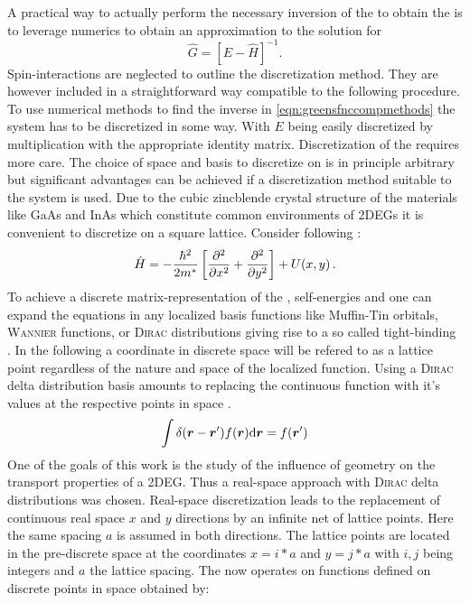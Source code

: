 A practical way to actually perform the necessary inversion of the \hamil{} to obtain the \gfnc{} is to leverage numerics to obtain an approximation to the solution for
\begin{equation}
	\hat{G} = \left[E-\hat{H} \right]^{-1}\text{.}
  \label{eqn:greensfnccompmethods}
\end{equation}
Spin-interactions are neglected to outline the discretization method. They are however included in a straightforward way compatible to the following procedure.
To use numerical methods to find the inverse in \cref{eqn:greensfnccompmethods} the system has to be discretized in some way. With $E$ being easily discretized by multiplication with the appropriate identity matrix. Discretization of the \hamil{} requires more care. The choice of space and basis to discretize on is in principle arbitrary but significant advantages can be achieved if a discretization method suitable to the system is used.
Due to the cubic zincblende crystal structure of the materials like GaAs and InAs which constitute common environments of 2DEGs it is convenient to discretize on a square lattice.
Consider following \hamil{}:
\begin{equation}
  \hat{H}=-\frac{\hbar^{2}}{2m^*}\left[\frac{\partial^2 }{\partial x^2}+\frac{\partial^2 }{\partial y^2}\right]+U(x,y)\text{\,.}
    \label{eqn:Hamil}
\end{equation}
To achieve a discrete matrix-representation of the \hamil{}, self-energies and \gfnc{} one can expand the equations in any localized basis functions like Muffin-Tin orbitals, \textsc{Wannier} functions, or \textsc{Dirac} distributions giving rise to a so called tight-binding \hamil{}. In the following a coordinate in discrete space will be refered to as a lattice point regardless of the nature and space of the localized function.
Using a \textsc{Dirac} delta distribution basis amounts to replacing the continuous function with it's values at the respective points in space \cite{JApplPhys.92.3730}.
\begin{equation}
  \int \delta (\boldsymbol{r}-\boldsymbol{r}') f(\boldsymbol{r}) \mathrm{d}\boldsymbol{r} = f(\boldsymbol{r}')
  \label{eqn:deltabasis}
\end{equation}
One of the goals of this work is the study of the influence of geometry on the transport properties of a 2DEG. Thus a real-space approach with \textsc{Dirac} delta distributions was chosen. Real-space discretization leads to the replacement of continuous real space $x$ and $y$ directions by an infinite net of lattice points. Here the same spacing $a$ is assumed in both directions. The lattice points are located in the pre-discrete space at the coordinates $x=i*a$ and $y=j*a$ with $i,j$ being integers and $a$ the lattice spacing. The \hamil{} now operates on functions defined on discrete points in space obtained by:
